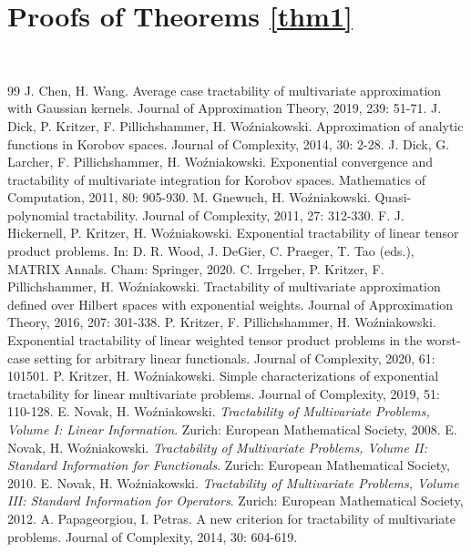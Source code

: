 \documentclass[10pt,a4paper]{amsart}
\numberwithin{equation}{section}
\begin{document}
\section{Proofs of Theorems \ref{thm1}}

\




\begin{thebibliography}{99}
 J. Chen, H. Wang. Average case tractability of multivariate approximation with Gaussian kernels. Journal of Approximation Theory, 2019, 239: 51-71.
 J. Dick, P. Kritzer, F. Pillichshammer, H. Wo\'zniakowski. Approximation of analytic functions in Korobov spaces. Journal of Complexity, 2014, 30: 2-28.
 J. Dick, G. Larcher, F. Pillichshammer, H. Wo\'zniakowski. Exponential convergence and tractability of multivariate integration for Korobov spaces. Mathematics of Computation, 2011, 80: 905-930.
 M. Gnewuch, H. Wo\'zniakowski. Quasi-polynomial tractability. Journal of Complexity, 2011, 27: 312-330.
 F. J. Hickernell, P. Kritzer, H. Wo\'zniakowski. Exponential tractability of linear tensor product problems. In: D. R. Wood, J. DeGier, C. Praeger, T. Tao (eds.), MATRIX Annals. Cham: Springer, 2020.
 C. Irrgeher, P. Kritzer, F. Pillichshammer, H. Wo\'zniakowski. Tractability of multivariate approximation defined over Hilbert spaces with exponential weights. Journal of Approximation Theory, 2016, 207: 301-338.
 P. Kritzer, F. Pillichshammer, H. Wo\'zniakowski. Exponential tractability of linear weighted tensor product problems in the worst-case setting for arbitrary linear functionals. {Journal of Complexity}, 2020, 61: 101501.
 P. Kritzer, H. Wo\'zniakowski. Simple characterizations of exponential tractability for linear multivariate problems. Journal of Complexity, 2019, 51: 110-128.
 E. Novak, H. Wo\'zniakowski. \textit{Tractability of Multivariate Problems, Volume I: Linear Information}. Zurich: European Mathematical Society, 2008.
 E. Novak, H. Wo\'zniakowski. \textit{Tractability of Multivariate Problems, Volume II: Standard Information for Functionals}. Zurich: European Mathematical Society, 2010.
 E. Novak, H. Wo\'zniakowski. \textit{Tractability of Multivariate Problems, Volume III: Standard Information for Operators}. Zurich: European Mathematical Society, 2012.
 A. Papageorgiou, I. Petras. A new criterion for tractability of multivariate problems. Journal of Complexity, 2014, 30: 604-619.

\end{thebibliography}
\end{document}
